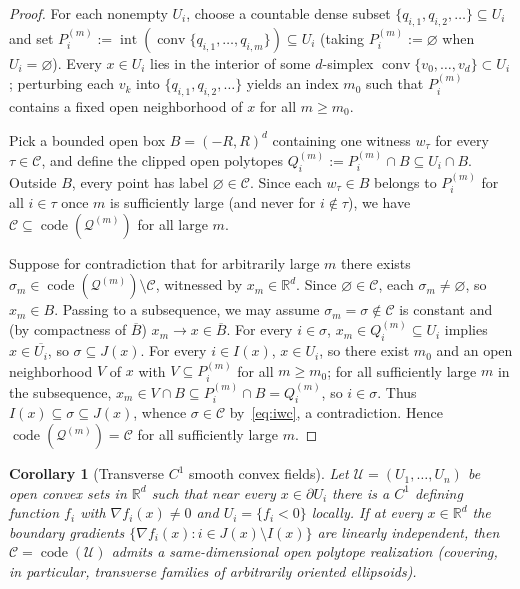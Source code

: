 \documentclass[11pt]{article}
\theoremstyle{plain}
\newtheorem{corollary}[theorem]{Corollary}
\theoremstyle{definition}
\theoremstyle{remark}
\DeclareMathOperator{\code}{code}
\DeclareMathOperator{\conv}{conv}
\DeclareMathOperator{\interior}{int}
\begin{document}
\begin{proof}
For each nonempty $U_i$, choose a countable dense subset $\{q_{i,1}, q_{i,2}, \dots\} \subseteq U_i$ and set $P_i^{(m)} := \interior(\conv\{q_{i,1}, \dots, q_{i,m}\}) \subseteq U_i$ (taking $P_i^{(m)} := \varnothing$ when $U_i = \varnothing$). Every $x \in U_i$ lies in the interior of some $d$-simplex $\conv\{v_0, \dots, v_d\} \subset U_i$; perturbing each $v_k$ into $\{q_{i,1}, q_{i,2}, \dots\}$ yields an index $m_0$ such that $P_i^{(m)}$ contains a fixed open neighborhood of $x$ for all $m \ge m_0$.

Pick a bounded open box $B = (-R, R)^d$ containing one witness $w_\tau$ for every $\tau \in \mathcal{C}$, and define the clipped open polytopes $Q_i^{(m)} := P_i^{(m)} \cap B \subseteq U_i \cap B$. Outside $B$, every point has label $\varnothing \in \mathcal{C}$. Since each $w_\tau \in B$ belongs to $P_i^{(m)}$ for all $i \in \tau$ once $m$ is sufficiently large (and never for $i \notin \tau$), we have $\mathcal{C} \subseteq \code(\mathcal{Q}^{(m)})$ for all large $m$.

Suppose for contradiction that for arbitrarily large $m$ there exists $\sigma_m \in \code(\mathcal{Q}^{(m)}) \setminus \mathcal{C}$, witnessed by $x_m \in \mathbb{R}^d$. Since $\varnothing \in \mathcal{C}$, each $\sigma_m \neq \varnothing$, so $x_m \in B$. Passing to a subsequence, we may assume $\sigma_m = \sigma \notin \mathcal{C}$ is constant and (by compactness of $\overline{B}$) $x_m \to x \in \overline{B}$. For every $i \in \sigma$, $x_m \in Q_i^{(m)} \subseteq U_i$ implies $x \in \overline{U_i}$, so $\sigma \subseteq J(x)$. For every $i \in I(x)$, $x \in U_i$, so there exist $m_0$ and an open neighborhood $V$ of $x$ with $V \subseteq P_i^{(m)}$ for all $m \ge m_0$; for all sufficiently large $m$ in the subsequence, $x_m \in V \cap B \subseteq P_i^{(m)} \cap B = Q_i^{(m)}$, so $i \in \sigma$. Thus $I(x) \subseteq \sigma \subseteq J(x)$, whence $\sigma \in \mathcal{C}$ by~\eqref{eq:iwc}, a contradiction. Hence $\code(\mathcal{Q}^{(m)}) = \mathcal{C}$ for all sufficiently large $m$.
\end{proof}

\begin{corollary}[Transverse $C^1$ smooth convex fields]\label{cor:transverse}
Let $\mathcal{U} = (U_1, \dots, U_n)$ be open convex sets in $\mathbb{R}^d$ such that near every $x \in \partial U_i$ there is a $C^1$ defining function $f_i$ with $\nabla f_i(x) \neq 0$ and $U_i = \{f_i < 0\}$ locally. If at every $x \in \mathbb{R}^d$ the boundary gradients $\{\nabla f_i(x) : i \in J(x) \setminus I(x)\}$ are linearly independent, then $\mathcal{C} = \code(\mathcal{U})$ admits a same-dimensional open polytope realization (covering, in particular, transverse families of arbitrarily oriented ellipsoids).
\end{corollary}
\end{document}
